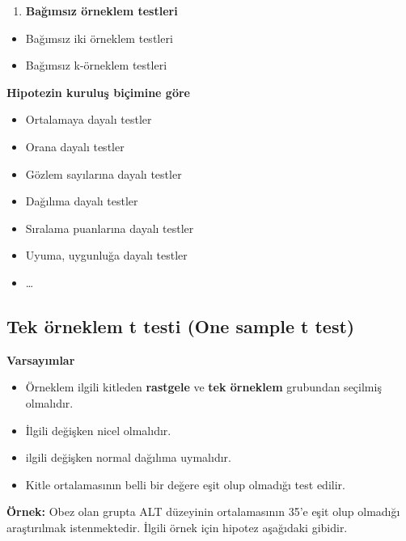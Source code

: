 \documentclass[
]{article}
\providecommand{\tightlist}{%
  \setlength{\itemsep}{0pt}\setlength{\parskip}{0pt}}
\begin{document}
\begin{enumerate}
\def\labelenumi{\arabic{enumi}.}
\setcounter{enumi}{1}
\tightlist
\item
  \textbf{Bağımsız örneklem testleri}
\end{enumerate}

\begin{itemize}
\tightlist
\item
  Bağımsız iki örneklem testleri
\item
  Bağımsız k-örneklem testleri
\end{itemize}

\textbf{Hipotezin kuruluş biçimine göre}

\begin{itemize}
\tightlist
\item
  Ortalamaya dayalı testler
\item
  Orana dayalı testler
\item
  Gözlem sayılarına dayalı testler
\item
  Dağılıma dayalı testler
\item
  Sıralama puanlarına dayalı testler
\item
  Uyuma, uygunluğa dayalı testler
\item
  \ldots{}
\end{itemize}

\hypertarget{tek-uxf6rneklem-t-testi-one-sample-t-test}{%
\subsection{Tek örneklem t testi (One sample t
test)}\label{tek-uxf6rneklem-t-testi-one-sample-t-test}}

\textbf{Varsayımlar}

\begin{itemize}
\tightlist
\item
  Örneklem ilgili kitleden \textbf{rastgele} ve \textbf{tek örneklem}
  grubundan seçilmiş olmalıdır.
\item
  İlgili değişken nicel olmalıdır.
\item
  ilgili değişken normal dağılıma uymalıdır.
\item
  Kitle ortalamasının belli bir değere eşit olup olmadığı test edilir.
\end{itemize}

\textbf{Örnek:} Obez olan grupta ALT düzeyinin ortalamasının 35'e eşit
olup olmadığı araştırılmak istenmektedir. İlgili örnek için hipotez
aşağıdaki gibidir.
\end{document}
